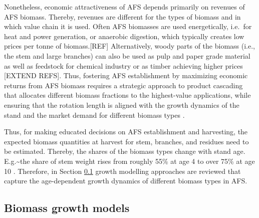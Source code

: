 \documentclass[preprint,review,1p,authoryear]{elsarticle} %
\begin{document}
Nonetheless, economic attractiveness of AFS depends primarily on
revenues of AFS biomass. Thereby, revenues are different for the types
of biomass and in which value chain it is used. Often AFS biomasses are
used energetically, i.e.~for heat and power generation, or anaerobic
digestion, which typically creates low prices per tonne of biomass.{[}REF{]}
Alternatively, woody parts of the biomass (i.e., the stem and large
branches) can also be used as pulp and paper grade material as well as
feedstock for chemical industry or as timber achieving higher prices
\citep{Lamers2015_Feedstock_Design} {[}EXTEND REFS{]}. Thus, fostering
AFS establishment by maximizing economic returns from AFS biomass
requires a strategic approach to product cascading that allocates
different biomass fractions to the highest-value applications, while
ensuring that the rotation length is aligned with the growth dynamics of
the stand and the market demand for different biomass types
\citep{Lamers2015_Feedstock_Design}.

Thus, for making educated decisions on AFS establishment and harvesting,
the expected biomass quantities at harvest for stem, branches, and
residues need to be estimated. Thereby, the shares of the biomass types
change with stand age. E.g.\textasciitilde the share of stem weight rises from roughly
55\% at age 4 to over 75\% at age 10 \citep{Huber2018_SRAFS_growth, Testa2014_Poplar_Economics}. Therefore, in Section
\ref{sec:lit-growth} growth modelling approaches are reviewed that
capture the age-dependent growth dynamics of different biomass types in
AFS.

\subsection{Biomass growth models}\label{sec:lit-growth}
\end{document}
